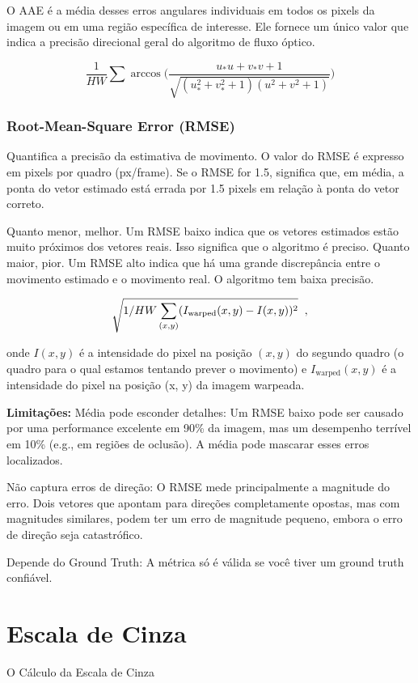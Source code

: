 \documentclass[12pt, a4paper]{article}
\begin{document}
O AAE é a média desses erros angulares individuais em todos os pixels da imagem ou em uma região específica de interesse. Ele fornece um único valor que indica a precisão direcional geral do algoritmo de fluxo óptico.

\[ \frac{1}{HW} \sum \arccos \Bigg( \frac{u_*u + v_*v + 1}{\sqrt{(u_*^2 + v_*^2 +1)(u^2 + v^2 + 1)}}\Bigg) \]

\subsubsection{Root-Mean-Square Error (RMSE)}

Quantifica a precisão da estimativa de movimento. O valor do RMSE é expresso em pixels por quadro (px/frame). Se o RMSE for 1.5, significa que, em média, a ponta do vetor estimado está errada por 1.5 pixels em relação à ponta do vetor correto.

Quanto menor, melhor. Um RMSE baixo indica que os vetores estimados estão muito próximos dos vetores reais. Isso significa que o algoritmo é preciso. Quanto maior, pior. Um RMSE alto indica que há uma grande discrepância entre o movimento estimado e o movimento real. O algoritmo tem baixa precisão.

\[ \sqrt{1/HW \sum_{(x,y)} (I_{\text{warped}} (x,y) - I(x,y))^2 } \hspace{0.2cm} ,\]

onde $I(x, y)$ é a intensidade do pixel na posição $(x, y)$ do segundo quadro (o quadro para o qual estamos tentando prever o movimento) e $I_{\text{warped}}(x, y)$ é a intensidade do pixel na posição (x, y) da imagem warpeada.

\textbf{Limitações:}
Média pode esconder detalhes: Um RMSE baixo pode ser causado por uma performance excelente em 90\% da imagem, mas um desempenho terrível em 10\% (e.g., em regiões de oclusão). A média pode mascarar esses erros localizados.

Não captura erros de direção: O RMSE mede principalmente a magnitude do erro. Dois vetores que apontam para direções completamente opostas, mas com magnitudes similares, podem ter um erro de magnitude pequeno, embora o erro de direção seja catastrófico.

Depende do Ground Truth: A métrica só é válida se você tiver um ground truth confiável.

\section{Escala de Cinza}
O Cálculo da Escala de Cinza
\end{document}
